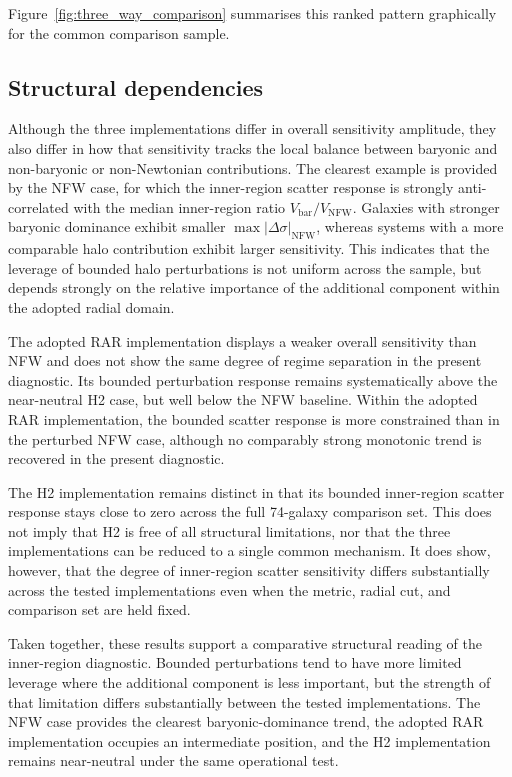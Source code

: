 \documentclass[fleqn,usenatbib]{mnras}
\begin{document}
Figure~\ref{fig:three_way_comparison} summarises this ranked pattern graphically for the common comparison sample.

\subsection{Structural dependencies}
\label{subsec:structural_dependencies}

Although the three implementations differ in overall sensitivity amplitude, they also differ in how that sensitivity tracks the local balance between baryonic and non-baryonic or non-Newtonian contributions. The clearest example is provided by the NFW case, for which the inner-region scatter response is strongly anti-correlated with the median inner-region ratio $V_{\mathrm{bar}}/V_{\mathrm{NFW}}$. Galaxies with stronger baryonic dominance exhibit smaller $\max |\Delta \sigma|_{\mathrm{NFW}}$, whereas systems with a more comparable halo contribution exhibit larger sensitivity. This indicates that the leverage of bounded halo perturbations is not uniform across the sample, but depends strongly on the relative importance of the additional component within the adopted radial domain.

The adopted RAR implementation displays a weaker overall sensitivity than NFW and does not show the same degree of regime separation in the present diagnostic. Its bounded perturbation response remains systematically above the near-neutral H2 case, but well below the NFW baseline. Within the adopted RAR implementation, the bounded scatter response is more constrained than in the perturbed NFW case, although no comparably strong monotonic trend is recovered in the present diagnostic.

The H2 implementation remains distinct in that its bounded inner-region scatter response stays close to zero across the full 74-galaxy comparison set. This does not imply that H2 is free of all structural limitations, nor that the three implementations can be reduced to a single common mechanism. It does show, however, that the degree of inner-region scatter sensitivity differs substantially across the tested implementations even when the metric, radial cut, and comparison set are held fixed.

Taken together, these results support a comparative structural reading of the inner-region diagnostic. Bounded perturbations tend to have more limited leverage where the additional component is less important, but the strength of that limitation differs substantially between the tested implementations. The NFW case provides the clearest baryonic-dominance trend, the adopted RAR implementation occupies an intermediate position, and the H2 implementation remains near-neutral under the same operational test.
\end{document}
